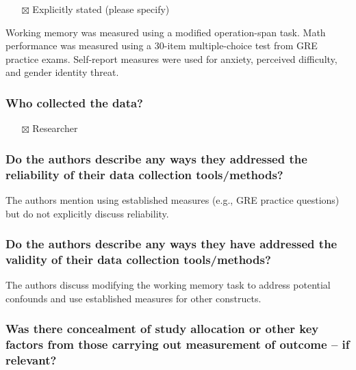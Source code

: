 \documentclass[
  doc, a4paper]{apa7}
\providecommand{\tightlist}{%
  \setlength{\itemsep}{0pt}\setlength{\parskip}{0pt}}
\begin{document}
\begin{itemize}
\tightlist
\item[$\boxtimes$]
  Explicitly stated (please specify)
\end{itemize}

Working memory was measured using a modified operation-span task. Math performance was measured using a 30-item multiple-choice test from GRE practice exams. Self-report measures were used for anxiety, perceived difficulty, and gender identity threat.

\subsubsection{Who collected the data?}\label{who-collected-the-data}

\begin{itemize}
\tightlist
\item[$\boxtimes$]
  Researcher
\end{itemize}

\subsubsection{Do the authors describe any ways they addressed the reliability of their data collection tools/methods?}\label{do-the-authors-describe-any-ways-they-addressed-the-reliability-of-their-data-collection-toolsmethods}

The authors mention using established measures (e.g., GRE practice questions) but do not explicitly discuss reliability.

\subsubsection{Do the authors describe any ways they have addressed the validity of their data collection tools/methods?}\label{do-the-authors-describe-any-ways-they-have-addressed-the-validity-of-their-data-collection-toolsmethods}

The authors discuss modifying the working memory task to address potential confounds and use established measures for other constructs.

\subsubsection{Was there concealment of study allocation or other key factors from those carrying out measurement of outcome -- if relevant?}\label{was-there-concealment-of-study-allocation-or-other-key-factors-from-those-carrying-out-measurement-of-outcome-if-relevant}
\end{document}

